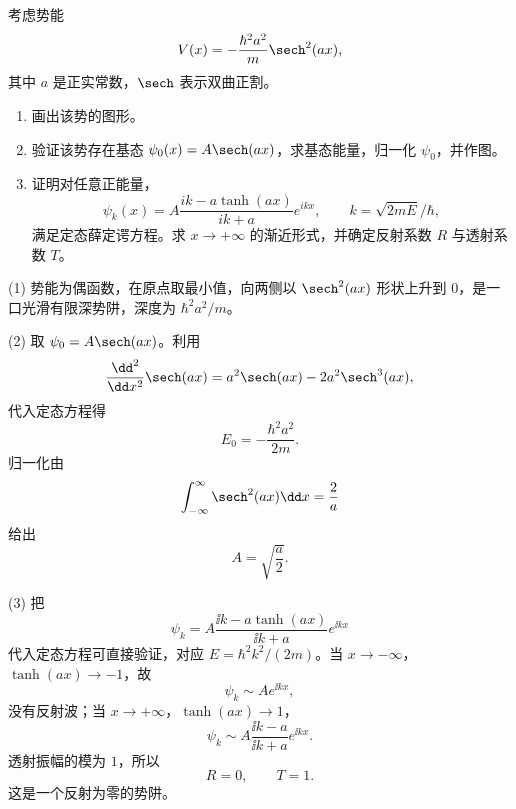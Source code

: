 \begin{question}
考虑势能
\[
V(x)=-\frac{\hbar^2a^2}{m}\sech^2(ax),
\]
其中 $a$ 是正实常数，$\sech$ 表示双曲正割。
\begin{enumerate}
\item 画出该势的图形。
\item 验证该势存在基态 $\psi_0(x)=A\sech(ax)$，求基态能量，归一化 $\psi_0$，并作图。
\item 证明对任意正能量，
\[
\psi_k(x)=A\frac{ik-a\tanh(ax)}{ik+a}e^{ikx},\qquad k=\sqrt{2mE}/\hbar,
\]
满足定态薛定谔方程。求 $x\to+\infty$ 的渐近形式，并确定反射系数 $R$ 与透射系数 $T$。
\end{enumerate}
\end{question}
\begin{solution}
(1) 势能为偶函数，在原点取最小值，向两侧以 $\sech^2(ax)$ 形状上升到 $0$，是一口光滑有限深势阱，深度为 $\hbar^2a^2/m$。

(2) 取 $\psi_0=A\sech(ax)$。利用
\[
\frac{\dd^2}{\dd x^2}\sech(ax)=a^2\sech(ax)-2a^2\sech^3(ax),
\]
代入定态方程得
\[
E_0=-\frac{\hbar^2a^2}{2m}.
\]
归一化由
\[
\int_{-\infty}^{\infty}\sech^2(ax)\dd x=\frac2a
\]
给出
\[
A=\sqrt{\frac a2}.
\]

(3) 把
\[
\psi_k=A\frac{\ii k-a\tanh(ax)}{\ii k+a}e^{\ii kx}
\]
代入定态方程可直接验证，对应 $E=\hbar^2k^2/(2m)$。当 $x\to-\infty$，$\tanh(ax)\to-1$，故
\[
\psi_k\sim Ae^{\ii kx},
\]
没有反射波；当 $x\to+\infty$，$\tanh(ax)\to1$，
\[
\psi_k\sim A\frac{\ii k-a}{\ii k+a}e^{\ii kx}.
\]
透射振幅的模为 $1$，所以
\[
R=0,
\qquad T=1.
\]
这是一个反射为零的势阱。
\end{solution}

